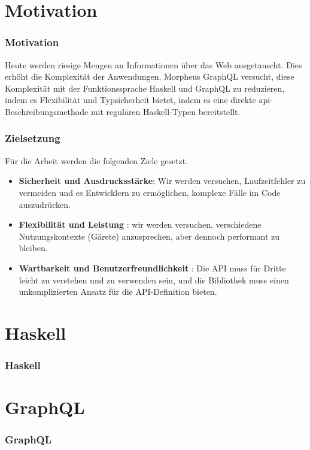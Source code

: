 
\section{Motivation}

\begin{frame}{}
    \frametitle{Motivation}

    Heute werden riesige Mengen an Informationen über das Web ausgetauscht. Dies erhöht die Komplexität der Anwendungen. Morpheus GraphQL versucht, diese Komplexität mit der Funktionssprache Haskell und GraphQL zu reduzieren, indem es Flexibilität und Typsicherheit bietet, indem es eine direkte api-Beschreibungsmethode mit regulären Haskell-Typen bereitstellt. 

\end{frame}

\begin{frame}
    \frametitle{Zielsetzung}

    Für die Arbeit werden die folgenden Ziele gesetzt.    

    \begin{itemize}

        \item \textbf{Sicherheit und Ausdrucksstärke}: Wir werden versuchen, Laufzeitfehler zu vermeiden und es Entwicklern zu ermöglichen, komplexe Fälle im Code auszudrücken.
        
        \item \textbf{Flexibilität und Leistung} : wir werden  versuchen, verschiedene Nutzungskontexte (Gärete) anzusprechen, aber dennoch performant zu bleiben. 
        
        \item \textbf{Wartbarkeit und Benutzerfreundlichkeit}
       :  Die API muss für Dritte leicht zu verstehen und zu verwenden sein, und die Bibliothek muss einen unkomplizierten Ansatz für die API-Definition bieten. 

    \end{itemize}   
\end{frame}

\section{Haskell}

\begin{frame}{}
    \frametitle{Haskell}
\end{frame}


\section{GraphQL}
\begin{frame}{}
    \frametitle{GraphQL}
\end{frame}
